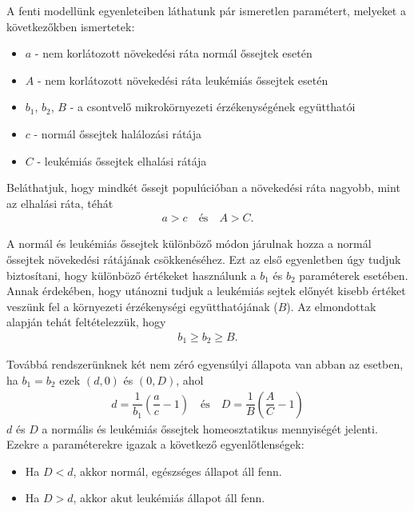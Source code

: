 A fenti modellünk egyenleteiben láthatunk pár ismeretlen paramétert, melyeket a következőkben ismertetek:
\begin{itemize}
	\item $ a $ - nem korlátozott növekedési ráta normál őssejtek esetén
	\item $ A $ - nem korlátozott növekedési ráta leukémiás őssejtek esetén
	\item $ b_{1} $, $ b_{2} $, $ B $ - a csontvelő mikrokörnyezeti érzékenységének együtthatói
	\item $ c $ - normál őssejtek halálozási rátája
	\item $ C $ - leukémiás őssejtek elhalási rátája
\end{itemize}

Beláthatjuk, hogy mindkét őssejt populúcióban a növekedési ráta nagyobb, mint az elhalási ráta, téhát
\begin{align*}
	a > c \quad \textrm{és} \quad A > C.
\end{align*}

A normál és leukémiás őssejtek különböző módon járulnak hozza a normál őssejtek növekedési rátájának csökkenéséhez. Ezt az első egyenletben úgy tudjuk biztosítani, hogy különböző értékeket használunk a $ b_{1} $ és $ b_{2} $ paraméterek esetében. Annak érdekében, hogy utánozni tudjuk a leukémiás sejtek előnyét kisebb értéket veszünk fel a környezeti érzékenységi együtthatójának ($ B $). Az elmondottak alapján tehát feltételezzük, hogy
\begin{align*}
	b_{1}\geq b_{2}\geq B.
\end{align*}

Továbbá rendszerünknek két nem zéró egyensúlyi állapota van abban az esetben, ha $ b_{1} = b_{2} $ ezek $ (d, 0) $ és $ (0, D) $, ahol
\begin{align*}
	d = \dfrac{1}{b_{1}}\left(\dfrac{a}{c}-1\right) \quad \textrm{és} \quad D = \dfrac{1}{B}\left(\dfrac{A}{C}-1\right)
\end{align*}
$ d $ és $ D $ a normális és leukémiás őssejtek homeosztatikus mennyiségét jelenti. Ezekre a paraméterekre igazak a következő egyenlőtlenségek:
\begin{itemize}
	\item Ha $ D < d $, akkor normál, egészséges állapot áll fenn.
	\item Ha $ D > d $, akkor akut leukémiás állapot áll fenn.
\end{itemize}
\pagebreak

